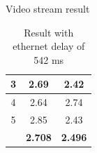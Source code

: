 \documentclass[xcolor=table]{beamer}
\begin{document}
\begin{frame}{Video stream result}
\begin{table}[]
{\begin{tabular}{|c|c|c|}
3                                                              & 2.69                                                                                                                                                & 2.42                                                                                                                                            \\ \hline
4                                                              & 2.64                                                                                                                                                & 2.74                                                                                                                                            \\ \hline
5                                                              & 2.85                                                                                                                                                & 2.43                                                                                                                                            \\ \hline
\rowcolor[HTML]{DBDBEB} 
\multicolumn{1}{|l|}{\cellcolor[HTML]{E4E4EF}\textbf{Average}} & \textbf{2.708}                                                                                                                                      & \textbf{2.496}                                                                                                                                  \\ \hline
\end{tabular}
}
\caption{Result with ethernet delay of 542 ms}
\end{table}
\end{frame}


\end{document}
